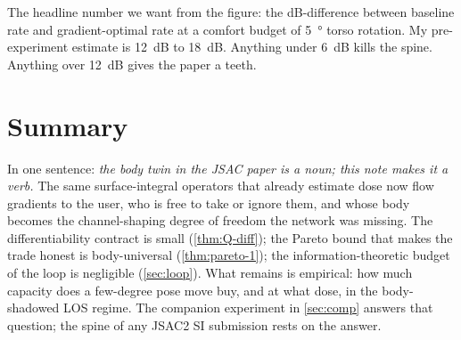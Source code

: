 \documentclass[11pt,a4paper]{article}
\theoremstyle{definition}
\begin{document}
The headline number we want from the figure: the dB-difference
between baseline rate and gradient-optimal rate at a comfort budget
of \SI{5}{\degree} torso rotation.  My pre-experiment estimate is
\SI{12}{dB} to \SI{18}{dB}.  Anything under \SI{6}{dB} kills the
spine.  Anything over \SI{12}{dB} gives the paper a teeth.

\section{Summary}\label{sec:sum}

In one sentence: \emph{the body twin in the JSAC paper is a noun;
this note makes it a verb.}  The same surface-integral operators
that already estimate dose now flow gradients to the user, who is
free to take or ignore them, and whose body becomes the channel-shaping
degree of freedom the network was missing.  The differentiability
contract is small (\cref{thm:Q-diff}); the Pareto bound that makes
the trade honest is body-universal (\cref{thm:pareto-1}); the
information-theoretic budget of the loop is negligible
(\cref{sec:loop}).  What remains is empirical: how much capacity
does a few-degree pose move buy, and at what dose, in the body-shadowed
LOS regime.  The companion experiment in \cref{sec:comp} answers
that question; the spine of any JSAC2 SI submission rests on the
answer.
\end{document}
